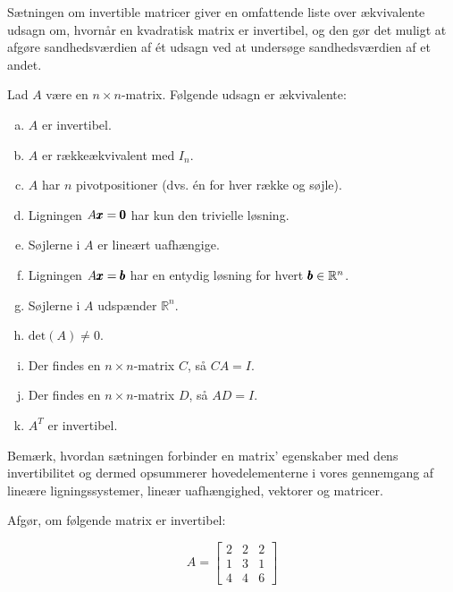 Sætningen om invertible matricer giver en omfattende liste over ækvivalente udsagn om, hvornår en kvadratisk matrix er invertibel, og den gør det muligt at afgøre sandhedsværdien af ét udsagn ved at undersøge sandhedsværdien af et andet.

\newpage

\begin{theorem}
    Lad \( A \) være en \( n \times n \)-matrix. Følgende udsagn er ækvivalente:
    \begin{enumerate}[(a)]
        \item $A$ er invertibel.
        \item $A$ er rækkeækvivalent med $I_n$.
        \item $A$ har $n$ pivotpositioner (dvs. én for hver række og søjle).
        \item Ligningen $A \pmb{x}=\pmb{0}$ har kun den trivielle løsning.
        \item Søjlerne i $A$ er lineært uafhængige.
        \item Ligningen \( A \pmb{x} = \pmb{b} \) har en entydig løsning for hvert \( \pmb{b} \in \mathbb{R}^n \).
        \item Søjlerne i $A$ udspænder $\mathbb{R}^n$.
        \item \( \text{det}(A) \neq 0 \).
        \item Der findes en $n \times n$-matrix $C$, så $C A=I$.
        \item Der findes en $n \times n$-matrix $D$, så $A D=I$.
        \item $A^T$ er invertibel.
    \end{enumerate}
\end{theorem}

Bemærk, hvordan sætningen forbinder en matrix' egenskaber med dens invertibilitet og dermed opsummerer hovedelementerne i vores gennemgang af lineære ligningssystemer, lineær uafhængighed, vektorer og matricer.

\begin{example} Afgør, om følgende matrix er invertibel:

\[
A=\left[\begin{array}{lll}
2 & 2 & 2 \\
1 & 3 & 1 \\
4 & 4 & 6
\end{array}\right]
\]

\end{example}

